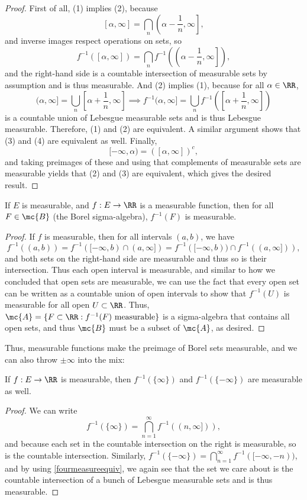 \begin{proof}
First of all, (1) implies (2), because
\[
    [\alpha, \infty] = \bigcap_n \left(\alpha - \frac{1}{n}, \infty\right],
\]
and inverse images respect operations on sets, so 
\[
    f^{-1}([\alpha, \infty]) = \bigcap_n f^{-1}\left(\left(\alpha - \frac{1}{n}, \infty\right]\right),
\]
and the right-hand side is a countable intersection of measurable sets by assumption and is thus measurable. And (2) implies (1), because for all $\alpha \in \RR$, 
\[
    (\alpha, \infty] = \bigcup_n \left[\alpha + \frac{1}{n}, \infty\right] \implies f^{-1}(\alpha, \infty] = \bigcup_n f^{-1}\left(\left[\alpha + \frac{1}{n}, \infty\right]\right)
\]
is a countable union of Lebesgue measurable sets and is thus Lebesgue measurable. Therefore, (1) and (2) are equivalent. A similar argument shows that (3) and (4) are equivalent as well. Finally,
\[
    [-\infty, \alpha) = ([\alpha, \infty])^c,
\]
and taking preimages of these and using that complements of measurable sets are measurable yields that (2) and (3) are equivalent, which gives the desired result.
\end{proof}

\begin{theorem}
If $E$ is measurable, and $f: E \to \RR$ is a measurable function, then for all $F \in \mc{B}$ (the Borel sigma-algebra), $f^{-1}(F)$ is measurable.
\end{theorem}
\begin{proof}
If $f$ is measurable, then for all intervals $(a, b)$, we have 
\[
    f^{-1}((a, b)) = f^{-1}([-\infty, b) \cap (a, \infty]) = f^{-1}([-\infty, b)) \cap f^{-1}((a, \infty])),
\]
and both sets on the right-hand side are measurable and thus so is their intersection. Thus each open interval is measurable, and similar to how we concluded that open sets are measurable, we can use the fact that every open set can be written as a countable union of open intervals to show that $f^{-1}(U)$ is measurable for all open $U \subset \RR$. Thus, $\mc{A} = \{F \subset \RR: f^{-1}(F) \text{ measurable}\}$ is a sigma-algebra that contains all open sets, and thus $\mc{B}$ must be a subset of $\mc{A}$, as desired.
\end{proof}

Thus, measurable functions make the preimage of Borel sets measurable, and we can also throw $\pm \infty$ into the mix:

\begin{theorem}
If $f: E \to \RR$ is measurable, then $f^{-1}(\{\infty\})$ and $f^{-1}(\{-\infty\})$ are measurable as well. 
\end{theorem}
\begin{proof}
We can write
\[
    f^{-1}(\{\infty\}) = \bigcap_{n=1}^{\infty} f^{-1}((n, \infty])),
\]
and because each set in the countable intersection on the right is measurable, so is the countable intersection. Similarly, $f^{-1}(\{-\infty\}) = \bigcap_{n=1}^{\infty} f^{-1}([-\infty, -n))$, and by using \cref{fourmeasureequiv}, we again see that the set we care about is the countable intersection of a bunch of Lebesgue measurable sets and is thus measurable. 
\end{proof}

